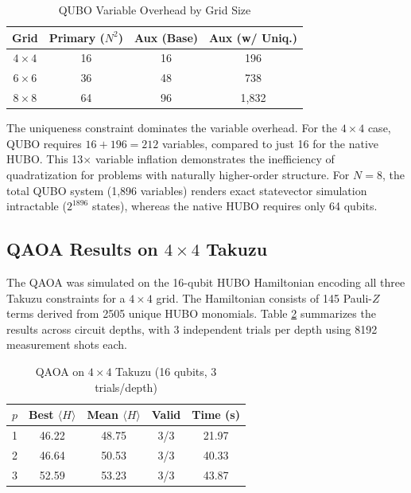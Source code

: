 \documentclass[eng]{ajceam-class}
\begin{document}
\begin{table}[h]
\centering
\caption{QUBO Variable Overhead by Grid Size}
\footnotesize
\begin{tabular}{|c|c|c|c|}
\hline
\textbf{Grid} & \textbf{Primary ($N^2$)} & \textbf{Aux (Base)} & \textbf{Aux (w/ Uniq.)} \\
\hline
$4 \times 4$ & 16 & 16 & 196 \\
$6 \times 6$ & 36 & 48 & 738 \\
$8 \times 8$ & 64 & 96 & 1,832 \\
\hline
\end{tabular}
\label{tab:overhead}
\end{table}

The uniqueness constraint dominates the variable overhead. For the $4 \times 4$ case, QUBO requires $16 + 196 = 212$ variables, compared to just 16 for the native HUBO. This 13$\times$ variable inflation demonstrates the inefficiency of quadratization for problems with naturally higher-order structure. For $N=8$, the total QUBO system (1,896 variables) renders exact statevector simulation intractable ($2^{1896}$ states), whereas the native HUBO requires only 64 qubits.

\subsection{QAOA Results on $4 \times 4$ Takuzu}

The QAOA was simulated on the 16-qubit HUBO Hamiltonian encoding all three Takuzu constraints for a $4 \times 4$ grid. The Hamiltonian consists of 145 Pauli-$Z$ terms derived from 2505 unique HUBO monomials. Table \ref{tab:qaoa_results} summarizes the results across circuit depths, with 3 independent trials per depth using 8192 measurement shots each.

\begin{table}[h]
\centering
\caption{QAOA on $4 \times 4$ Takuzu (16 qubits, 3 trials/depth)}
\footnotesize
\begin{tabular}{|c|c|c|c|c|}
\hline
$p$ & Best $\langle H \rangle$ & Mean $\langle H \rangle$ & Valid & Time (s) \\
\hline
1 & 46.22 & 48.75 & 3/3 & 21.97 \\
2 & 46.64 & 50.53 & 3/3 & 40.33 \\
3 & 52.59 & 53.23 & 3/3 & 43.87 \\
\hline
\end{tabular}
\label{tab:qaoa_results}
\end{table}
\end{document}
